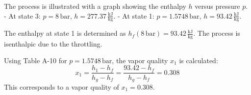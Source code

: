 The process is illustrated with a graph showing the enthalpy \( h \) versus pressure \( p \).  
- At state 3: \( p = 8 \, \text{bar} \), \( h = 277.37 \, \frac{\text{kJ}}{\text{kg}} \).  
- At state 1: \( p = 1.5748 \, \text{bar} \), \( h = 93.42 \, \frac{\text{kJ}}{\text{kg}} \).  

The enthalpy at state 1 is determined as \( h_f(8 \, \text{bar}) = 93.42 \, \frac{\text{kJ}}{\text{kg}} \). The process is isenthalpic due to the throttling.

Using Table A-10 for \( p = 1.5748 \, \text{bar} \), the vapor quality \( x_1 \) is calculated:  
\[
x_1 = \frac{h_1 - h_f}{h_g - h_f} = \frac{93.42 - h_f}{h_g - h_f} = 0.308
\]  
This corresponds to a vapor quality of \( x_1 = 0.308 \).